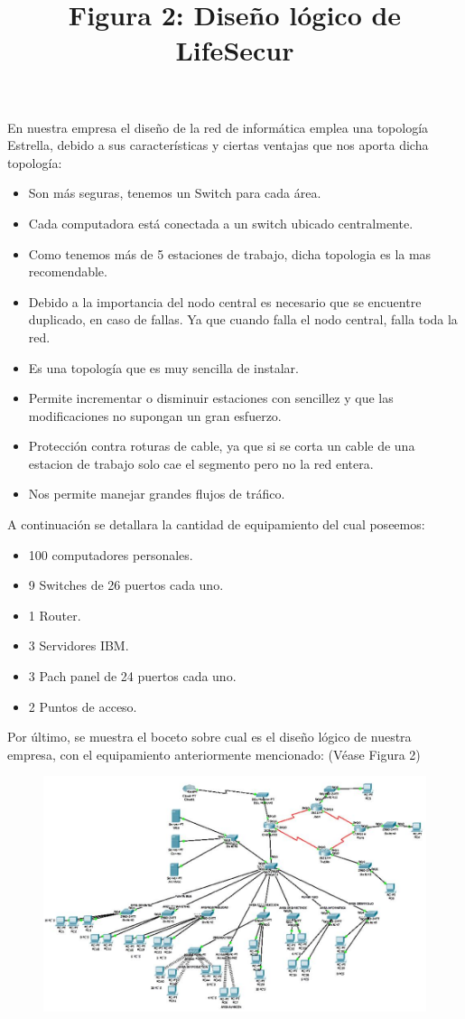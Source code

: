 \documentclass[11pt,bibtotoc,noliststotoc,BCOR0mm]{scrbook}
\begin{document}
En nuestra empresa el diseño de la red de informática emplea una topología Estrella, debido a sus características y ciertas ventajas que nos aporta dicha topología:
\begin{itemize}
\item Son más seguras, tenemos un Switch para cada área.
\item Cada computadora está conectada a un switch  ubicado centralmente.
\item Como tenemos más de 5 estaciones de trabajo, dicha topologia es la mas recomendable.
\item Debido a la importancia del nodo central es necesario que se encuentre duplicado, en caso de fallas. Ya que cuando falla el nodo central, falla toda la red.
\item Es una topología que es muy sencilla de instalar.
\item Permite incrementar o disminuir estaciones con sencillez y que las modificaciones no supongan un gran esfuerzo.
\item Protección contra roturas de cable, ya que si se corta un cable de una estacion de trabajo solo cae el segmento pero no la red entera.
\item Nos permite manejar grandes flujos de tráfico.
\end{itemize}

A continuación se detallara la cantidad de equipamiento del cual poseemos:

\begin{itemize}
\item 100 computadores personales.
\item 9 Switches de 26 puertos cada uno.
\item 1 Router.
\item 3 Servidores IBM.
\item 3 Pach panel de 24 puertos cada uno.
\item 2 Puntos de acceso.
\end{itemize}

Por último, se muestra el boceto sobre cual es el diseño lógico de nuestra empresa, con el equipamiento anteriormente mencionado: (Véase Figura 2)

\begin{figure}[ht]
	\includegraphics[scale=0.6]{log}
    \centering \title{Figura 2: Diseño lógico de LifeSecur}
\end{figure}
\end{document}
